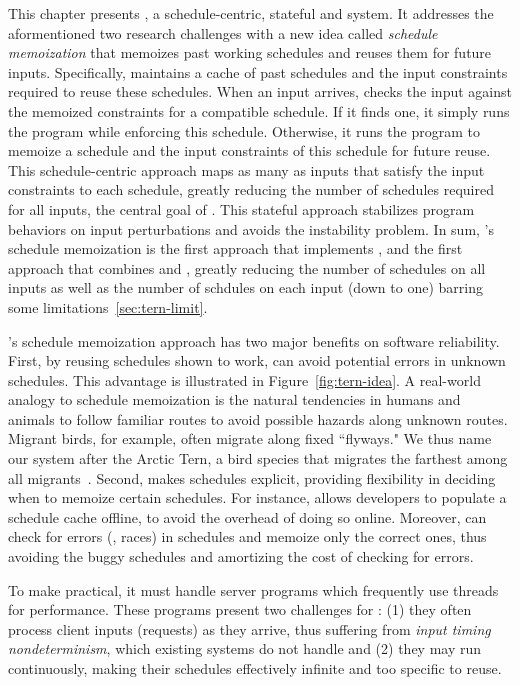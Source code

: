 This chapter presents \tern, a schedule-centric, stateful \smt and \dmt system. 
It addresses the aformentioned two research challenges with a new idea called
\emph{schedule memoization} that memoizes past working schedules and reuses them
for future inputs.  Specifically, \tern maintains a cache of past schedules and
the input constraints required to reuse these schedules.  When an input arrives,
\tern checks the input against the memoized constraints for a compatible
schedule.  If it finds one, it simply runs the program while enforcing
this schedule.  Otherwise, it runs the program to memoize a schedule and
the input constraints of this schedule for future reuse. This schedule-centric
approach maps as many as inputs that satisfy the input constraints to each
schedule, greatly reducing the number of schedules required for all inputs, the
central goal of \smt. This stateful approach stabilizes program behaviors
on input perturbations and avoids the instability problem. In sum, \tern's
schedule memoization is the first approach that implements \smt, and the first
approach that combines \smt and \dmt, greatly reducing the number of schedules
on all inputs as well as the number of schdules on each input (down to one)
barring some limitations~\ref{sec:tern-limit}.

\tern's schedule memoization approach has two major benefits on software
reliability. First, by reusing schedules shown to work, \tern can avoid
potential errors in unknown schedules.  This advantage is illustrated in
Figure~\ref{fig:tern-idea}. A real-world analogy to schedule memoization is the
natural tendencies in humans and animals to follow familiar routes to avoid
possible hazards along unknown routes.  Migrant birds, for example, often
migrate along fixed ``flyways."  We thus name our system after the Arctic Tern,
a bird species that migrates the farthest among all
migrants~\cite{artic-tern-wiki}. Second, \tern makes schedules explicit,
providing flexibility in deciding when to memoize certain schedules.  For
instance, \tern allows developers to populate a schedule cache offline, to avoid
the overhead of doing so online.  Moreover, \tern can check for errors (\eg,
races) in schedules and memoize only the correct ones, thus avoiding the buggy
schedules and amortizing the cost of checking for errors.

To make \tern practical, it must handle server programs which frequently
use threads for performance.  These programs present two challenges for
\tern: (1) they often process client inputs (requests) as they arrive, thus
suffering from \emph{input timing nondeterminism}, which existing \dmt systems
do not handle and (2) they may run continuously, making their schedules
effectively infinite and too specific to reuse.

